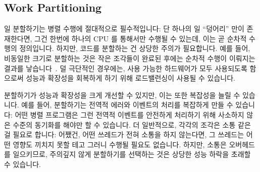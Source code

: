 \subsection{Work Partitioning}
\label{sec:intro:Work Partitioning}

일 분할하기는 병렬 수행에 절대적으로 필수적입니다: 단 하나의 일 ``덩어리'' 만이
존재한다면, 그건 한번에 하나의 CPU 를 통해서만 수행될 수 있는데, 이는 곧 순차적
수행의 정의입니다.
하지만, 코드를 분할하는 건 상당한 주의가 필요합니다.
예를 들어, 비동일한 크기로 분할하는 것은 작은 조각들이 완료된 후에는 순차적
수행이 이뤄지는 결과를 낳습니다~\cite{GeneAmdahl1967AmdahlsLaw}.
덜 극단적인 경우에는, 사용 가능한 하드웨어가 모두 사용되도록 함으로써 성능과
확장성을 회복하게 하기 위해 로드밸런싱이 사용될 수 있습니다.

분할하기가 성능과 확장성을 크게 개선할 수 있지만, 이는 또한 복잡성을 늘릴 수
있습니다.
예를 들어, 분할하기는 전역적 에러와 이벤트의 처리를 복잡하게 만들 수 있습니다:
어떤 병렬 프로그램은 그런 전역적 이벤트를 안전하게 처리하기 위해 사소하지 않은
수준의 동기화를 해야만 할 수 있습니다.
더 일반적으로, 각각의 조각은 소통 같은 걸 필요로 합니다:
어쨌건, 어떤 쓰레드가 전혀 소통을 하지 않는다면, 그 쓰레드는 어떤 영향도 끼치지
못할 테고 그러니 수행될 필요도 없습니다.
하지만, 소통은 오버헤드를 일으키므로, 주의깊지 않게 분할하기를 선택하는 것은
상당한 성능 하락을 초래할 수 있습니다.


